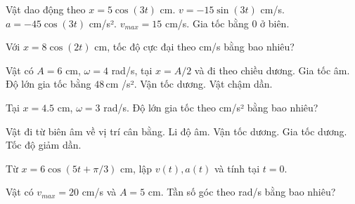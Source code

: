 \begin{ex}
Vật dao động theo $x=5\cos(3t)$ cm.
\choiceTF
{\True $v=-15\sin(3t)$ cm/s.}
{\True $a=-45\cos(3t)$ cm/s².}
{\True $v_{max}=15$ cm/s.}
{Gia tốc bằng 0 ở biên.}
\end{ex}

\begin{ex}
Với $x=8\cos(2t)$ cm, tốc độ cực đại theo cm/s bằng bao nhiêu?
\end{ex}

\begin{ex}
Vật có $A=6$ cm, $\omega=4$ rad/s, tại $x=A/2$ và đi theo chiều dương.
\choiceTF
{\True Gia tốc âm.}
{\True Độ lớn gia tốc bằng $48\,\text{cm}$ /s².}
{\True Vận tốc dương.}
{\True Vật chậm dần.}
\end{ex}

\begin{ex}
Tại $x=4.5$ cm, $\omega=3$ rad/s. Độ lớn gia tốc theo cm/s² bằng bao nhiêu?
\end{ex}

\begin{ex}
Vật đi từ biên âm về vị trí cân bằng.
\choiceTF
{\True Li độ âm.}
{\True Vận tốc dương.}
{\True Gia tốc dương.}
{Tốc độ giảm dần.}
\end{ex}

\begin{ex}
Từ $x=6\cos(5t+\pi/3)$ cm, lập $v(t),a(t)$ và tính tại $t=0$.
\choiceTF

\end{ex}

\begin{ex}
Vật có $v_{max}=20$ cm/s và $A=5$ cm. Tần số góc theo rad/s bằng bao nhiêu?
\end{ex}

